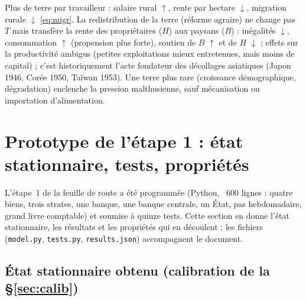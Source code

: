 \documentclass[11pt,a4paper]{article}
\newcommand{\up}{$\uparrow$}
\newcommand{\dn}{$\downarrow$}
\begin{document}
\direct Plus de terre par travailleur : salaire rural \up, rente par hectare \dn, migration rurale \dn{} \eqref{eq:migr}.
\second La redistribution de la terre (réforme agraire) ne change pas $T$ mais transfère la rente des propriétaires ($H$) aux paysans ($B$) : inégalités \dn, consommation \up{} (propension plus forte), soutien de $B$ \up{} et de $H$ \dn{} ; effets sur la productivité ambigus (petites exploitations mieux entretenues, mais moins de capital) ; c'est historiquement l'acte fondateur des décollages asiatiques (Japon 1946, Corée 1950, Taïwan 1953).
\baisse Une terre plus rare (croissance démographique, dégradation) enclenche la pression malthusienne, sauf mécanisation ou importation d'alimentation.

\section{Prototype de l'étape 1 : état stationnaire, tests, propriétés}
\label{sec:proto}
L'étape~1 de la feuille de route a été programmée (Python, ~600 lignes : quatre biens, trois strates, une banque, une banque centrale, un État, pas hebdomadaire, grand livre comptable) et soumise à quinze tests. Cette section en donne l'état stationnaire, les résultats et les propriétés qui en découlent ; les fichiers (\texttt{model.py}, \texttt{tests.py}, \texttt{results.json}) accompagnent le document.

\subsection{État stationnaire obtenu (calibration de la \S\ref{sec:calib})}
\label{sec:ssref}
\end{document}
